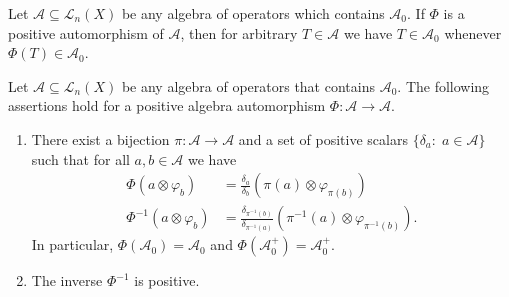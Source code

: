 \documentclass[10pt,a4paper]{amsart}
\begin{document}
\begin{proposition}\label{a0 pride iz a0}
Let $\mathscr A\subseteq \mathscr L_n(X)$ be any algebra of operators which contains $\mathscr A_0$. If $\Phi$ is a positive automorphism of $\mathscr A$, then for arbitrary $T\in \mathscr A$ we have $T\in \mathscr A_0$ whenever $\Phi(T)\in \mathscr A_0$.
\end{proposition}

\begin{theorem}\label{main theorem}
Let $\mathscr A\subseteq \mathscr L_n(X)$ be any algebra of operators that contains $\mathscr A_0$. The following assertions hold for a positive algebra automorphism $\Phi\colon \mathscr A\to \mathscr A$.
\begin{enumerate}
  \item There exist a bijection $\pi\colon\mathcal A\to\mathcal A$ and a set of positive scalars $\{\delta_a:\; a\in\mathcal A\}$ such that
for all $a,b\in\mathcal A$ we have
\begin{align}
\Phi(a\otimes\varphi_b)&=\tfrac{\delta_a}{\delta_b} \left(\pi(a)\otimes\varphi_{\pi(b)}\right) \label{formula1}\\
\Phi^{-1}(a\otimes\varphi_b)&=\tfrac{\delta_{\pi^{-1}(b)}}{\delta_{\pi^{-1}(a)}} \left(\pi^{-1}(a)\otimes\varphi_{\pi^{-1}(b)}\right). \label{formula2}
\end{align}
In particular,
$\Phi(\mathscr A_0)=\mathscr A_0$ and $\Phi(\mathscr A_0^+)=\mathscr A_0^+$. 
  \item The inverse $\Phi^{-1}$ is positive.
\end{enumerate}
\end{theorem}
\end{document}
